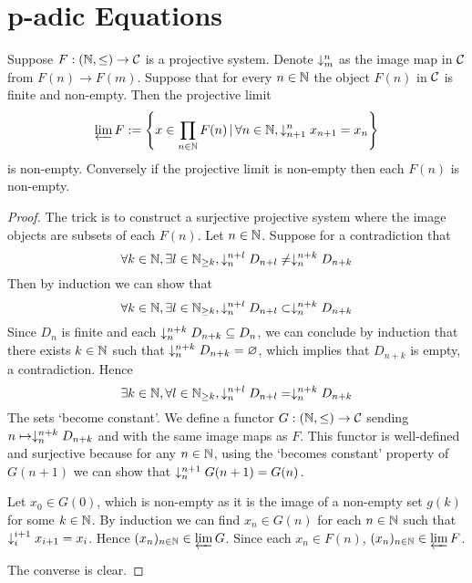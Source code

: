 \section{p-adic Equations}
\begin{prop}
    Suppose $F : (\mathbb{N},\le) \to \mathcal{C}$ is a projective system.
    Denote $\downarrow_{m}^{n}$ as the image map in $\mathcal{C}$ 
    from $F(n) \to F(m)$.
    Suppose that for every $n \in \mathbb{N}$ the object
    $F(n)$ in $\mathcal{C}$ is finite and non-empty.
    Then the projective limit 
    \[\varprojlim F := \left\{
        x \in \prod_{n\in \mathbb{N}} F(n) \,|\, \forall n \in \mathbb{N}, 
        \downarrow_{n+1}^{n}x_{n+1} = x_n\right\}\]
    is non-empty.
    Conversely if the projective limit is non-empty
    then each $F(n)$ is non-empty.
\end{prop}
\begin{proof}
    The trick is to construct a surjective projective system where
    the image objects are subsets of each $F(n)$.
    Let $n \in \mathbb{N}$.
    Suppose for a contradiction that 
    \[\forall k \in \mathbb{N}, \exists l \in \mathbb{N}_{\ge k}, 
    \downarrow_{n}^{n+l} D_{n+l} \ne \downarrow_{n}^{n+k} D_{n+k}\]
    Then by induction we can show that 
    \[\forall k \in \mathbb{N}, \exists l \in \mathbb{N}_{\ge k}, 
    \downarrow_{n}^{n+l} D_{n+l} \subset \downarrow_{n}^{n+k} D_{n+k}\]
    Since $D_n$ is finite and each 
    $\downarrow_{n}^{n+k} D_{n+k} \subseteq D_n$,
    we can conclude by induction that there exists 
    $k \in \mathbb{N}$ such that 
    $\downarrow_{n}^{n+k} D_{n+k} = \varnothing$,
    which implies that $D_{n+k}$ is empty,
    a contradiction.
    Hence 
    \[\exists k \in \mathbb{N}, \forall l \in \mathbb{N}_{\ge k}, 
    \downarrow_{n}^{n+l} D_{n+l} = \downarrow_{n}^{n+k} D_{n+k}\]
    The sets `become constant'.
    We define a functor $G : (\mathbb{N},\le) \to \mathcal{C}$
    sending $n \mapsto \downarrow_{n}^{n+k} D_{n+k}$ and
    with the same image maps as $F$.
    This functor is well-defined and surjective because
    for any $n\in \mathbb{N}$, 
    using the `becomes constant' property of $G(n + 1)$
    we can show that $\downarrow_{n}^{n+1} G(n+1) = G(n)$.
    
    Let $x_0 \in G(0)$, 
    which is non-empty as it is the 
    image of a non-empty set $g(k)$ for some
    $k \in \mathbb{N}$.
    By induction we can find $x_n \in G(n)$ 
    for each $n \in \mathbb{N}$ such that 
    $\downarrow_{i}^{i + 1} x_{i+1} = x_i$.
    Hence $(x_n)_{n \in \mathbb{N}} \in \varprojlim G$.
    Since each $x_n \in F(n)$, 
    $(x_n)_{n \in \mathbb{N}} \in \varprojlim F$.

    The converse is clear.
\end{proof}

